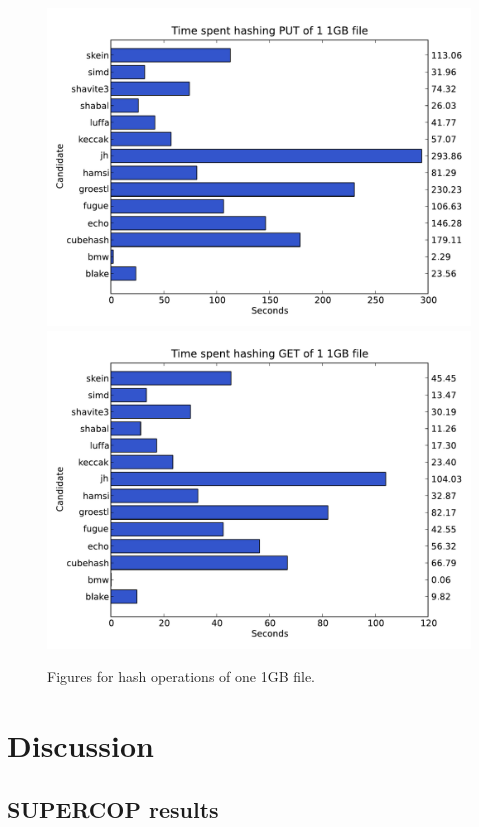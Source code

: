 \documentclass[english,12pt,a4paper]{book}
\begin{document}
\begin{figure}[h!]
    \centering
    \includegraphics[width=0.9\columnwidth]{graphs/TimespenthashingPUTof11GBfile.pdf}
    \includegraphics[width=0.9\columnwidth]{graphs/TimespenthashingGETof11GBfile.pdf}
    \caption{Figures for hash operations of one 1GB file.}
    \label{fig:graph:11gb}
\end{figure}

\chapter{Discussion}
\label{ch:discussion}

\section{\ac{SUPERCOP} results}
\end{document}
